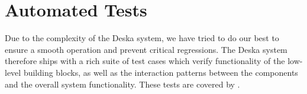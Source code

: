 \documentclass[deska]{subfiles}
\begin{document}
\section{Automated Tests}

Due to the complexity of the Deska system, we have tried to do our best to ensure a smooth operation and prevent
critical regressions.  The Deska system therefore ships with a rich suite of test cases which verify functionality of
the low-level building blocks, as well as the interaction patterns between the components and the overall system
functionality.  These tests are covered by .
\end{document}
